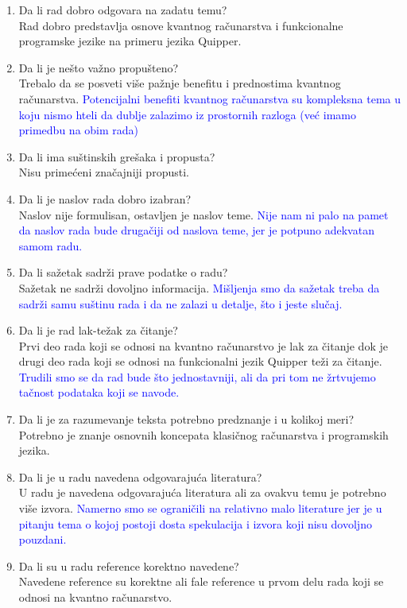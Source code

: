 \documentclass[a4paper]{report}
\newcommand{\odgovor}[1]{\textcolor{blue}{#1}}
\begin{document}
\begin{enumerate}
\item Da li rad dobro odgovara na zadatu temu?\\
Rad dobro predstavlja osnove kvantnog računarstva i funkcionalne programske jezike na primeru jezika Quipper.
\item Da li je nešto važno propušteno?\\
Trebalo da se posveti više pažnje benefitu i prednostima kvantnog računarstva.
\odgovor {Potencijalni benefiti kvantnog računarstva su kompleksna tema u koju nismo hteli da dublje zalazimo iz prostornih razloga (već imamo primedbu na obim rada)}
\item Da li ima suštinskih grešaka i propusta?\\
Nisu primećeni značajniji propusti.
\item Da li je naslov rada dobro izabran?\\
Naslov nije formulisan, ostavljen je naslov teme.
\odgovor {Nije nam ni palo na pamet da naslov rada bude drugačiji od naslova teme, jer je potpuno adekvatan samom radu.}
\item Da li sažetak sadrži prave podatke o radu?\\
Sažetak ne sadrži dovoljno informacija.
\odgovor {Mišljenja smo da sažetak treba da sadrži samu suštinu rada i da ne zalazi u detalje, što i jeste slučaj.}
\item Da li je rad lak-težak za čitanje?\\
Prvi deo rada koji se odnosi na kvantno računarstvo je lak za čitanje dok je drugi deo rada koji se odnosi na funkcionalni jezik Quipper teži za čitanje. 
\odgovor {Trudili smo se da rad bude što jednostavniji, ali da pri tom ne žrtvujemo tačnost podataka koji se navode.}
\item Da li je za razumevanje teksta potrebno predznanje i u kolikoj meri?\\
Potrebno je znanje osnovnih koncepata klasičnog računarstva i programskih jezika.
\item Da li je u radu navedena odgovarajuća literatura?\\
U radu je navedena odgovarajuća literatura ali za ovakvu temu je potrebno više izvora.
\odgovor {Namerno smo se ograničili na relativno malo literature jer je u pitanju tema o kojoj postoji dosta spekulacija i izvora koji nisu dovoljno pouzdani.}
\item Da li su u radu reference korektno navedene?\\
Navedene reference su korektne ali fale reference u prvom delu rada koji se odnosi na kvantno računarstvo. 

\end{enumerate}
\end{document}
